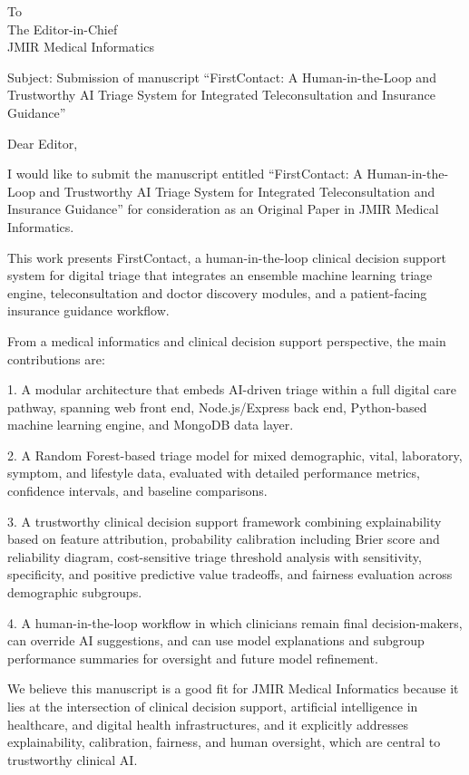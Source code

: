 \documentclass[12pt]{article}
\begin{document}
To\\
The Editor-in-Chief\\
JMIR Medical Informatics

\bigskip

Subject: Submission of manuscript ``FirstContact: A Human-in-the-Loop and Trustworthy AI Triage System for Integrated Teleconsultation and Insurance Guidance''

\bigskip

Dear Editor,

\bigskip

I would like to submit the manuscript entitled ``FirstContact: A Human-in-the-Loop and Trustworthy AI Triage System for Integrated Teleconsultation and Insurance Guidance'' for consideration as an Original Paper in JMIR Medical Informatics.

This work presents FirstContact, a human-in-the-loop clinical decision support system for digital triage that integrates an ensemble machine learning triage engine, teleconsultation and doctor discovery modules, and a patient-facing insurance guidance workflow.

From a medical informatics and clinical decision support perspective, the main contributions are:

1. A modular architecture that embeds AI-driven triage within a full digital care pathway, spanning web front end, Node.js/Express back end, Python-based machine learning engine, and MongoDB data layer.

2. A Random Forest-based triage model for mixed demographic, vital, laboratory, symptom, and lifestyle data, evaluated with detailed performance metrics, confidence intervals, and baseline comparisons.

3. A trustworthy clinical decision support framework combining explainability based on feature attribution, probability calibration including Brier score and reliability diagram, cost-sensitive triage threshold analysis with sensitivity, specificity, and positive predictive value tradeoffs, and fairness evaluation across demographic subgroups.

4. A human-in-the-loop workflow in which clinicians remain final decision-makers, can override AI suggestions, and can use model explanations and subgroup performance summaries for oversight and future model refinement.

We believe this manuscript is a good fit for JMIR Medical Informatics because it lies at the intersection of clinical decision support, artificial intelligence in healthcare, and digital health infrastructures, and it explicitly addresses explainability, calibration, fairness, and human oversight, which are central to trustworthy clinical AI.
\end{document}
